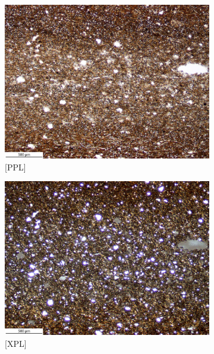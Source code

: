 \documentclass[a4paper]{article}
\begin{document}
\begin{figure}[H]
	\centering
	\begin{subfigure}[t]{.49\textwidth}
		\includegraphics[width=\textwidth]{ThinSections/109-1_4x_PPL.jpg}
		\caption{[PPL]}
	\end{subfigure}\hspace{.5em}\hfill
	\begin{subfigure}[t]{.49\textwidth}
		\includegraphics[width=\textwidth]{ThinSections/109-1_4x_XPL.jpg}
		\caption{[XPL]}
	\end{subfigure}
	\begin{subfigure}[t]{.49\textwidth}

\end{subfigure}
\end{figure}
\end{document}
